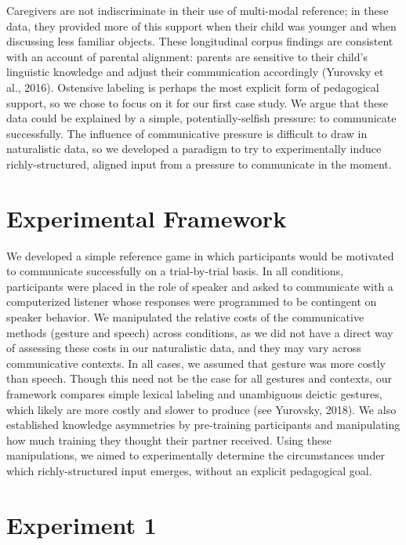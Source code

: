 \documentclass[english,,man,floatsintext]{apa6}
\begin{document}
Caregivers are not indiscriminate in their use of multi-modal reference; in these data, they provided more of this support when their child was younger and when discussing less familiar objects. These longitudinal corpus findings are consistent with an account of parental alignment: parents are sensitive to their child's linguistic knowledge and adjust their communication accordingly (Yurovsky et al., 2016). Ostensive labeling is perhaps the most explicit form of pedagogical support, so we chose to focus on it for our first case study. We argue that these data could be explained by a simple, potentially-selfish pressure: to communicate successfully. The influence of communicative pressure is difficult to draw in naturalistic data, so we developed a paradigm to try to experimentally induce richly-structured, aligned input from a pressure to communicate in the moment.

\hypertarget{experimental-framework}{%
\section{Experimental Framework}\label{experimental-framework}}

We developed a simple reference game in which participants would be motivated to communicate successfully on a trial-by-trial basis. In all conditions, participants were placed in the role of speaker and asked to communicate with a computerized listener whose responses were programmed to be contingent on speaker behavior. We manipulated the relative costs of the communicative methods (gesture and speech) across conditions, as we did not have a direct way of assessing these costs in our naturalistic data, and they may vary across communicative contexts. In all cases, we assumed that gesture was more costly than speech. Though this need not be the case for all gestures and contexts, our framework compares simple lexical labeling and unambiguous deictic gestures, which likely are more costly and slower to produce (see Yurovsky, 2018). We also established knowledge asymmetries by pre-training participants and manipulating how much training they thought their partner received. Using these manipulations, we aimed to experimentally determine the circumstances under which richly-structured input emerges, without an explicit pedagogical goal.

\hypertarget{experiment-1}{%
\section{Experiment 1}\label{experiment-1}}
\end{document}
